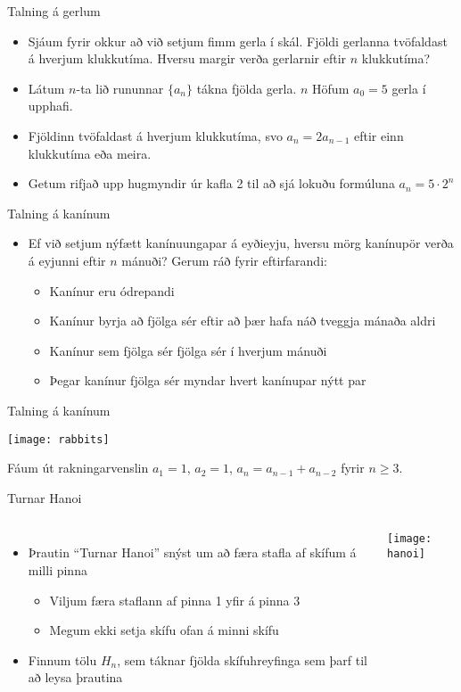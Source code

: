 \documentclass{beamer}
\begin{document}
\begin{frame}{Talning á gerlum}
\begin{itemize}[<+->]
 \item Sjáum fyrir okkur að við setjum fimm gerla í skál. Fjöldi gerlanna tvöfaldast á hverjum klukkutíma. Hversu margir verða gerlarnir eftir $n$ klukkutíma?
 \item Látum $n$-ta lið rununnar $\{a_n\}$ tákna fjölda gerla. $n$ Höfum $a_0 = 5$ gerla í upphafi.
 \item Fjöldinn tvöfaldast á hverjum klukkutíma, svo $a_n = 2a_{n-1}$ eftir einn klukkutíma eða meira.
 \item Getum rifjað upp hugmyndir úr kafla 2 til að sjá lokuðu formúluna $a_n = 5\cdot 2^n$
\end{itemize}
\end{frame}

\begin{frame}{Talning á kanínum}
 \begin{itemize}
  \item Ef við setjum nýfætt kanínuungapar á eyðieyju, hversu mörg kanínupör verða á eyjunni eftir $n$ mánuði? Gerum ráð fyrir eftirfarandi:
  \begin{itemize}
   \item Kanínur eru ódrepandi
   \item Kanínur byrja að fjölga sér eftir að þær hafa náð tveggja mánaða aldri
   \item Kanínur sem fjölga sér fjölga sér í hverjum mánuði
   \item Þegar kanínur fjölga sér myndar hvert kanínupar nýtt par
  \end{itemize}
 \end{itemize}
\end{frame}

\begin{frame}{Talning á kanínum}

\begin{center}
\texttt{[image: rabbits]}
\end{center}
Fáum út rakningarvenslin $a_1 = 1$, $a_2 = 1$, $a_n = a_{n-1} + a_{n-2}$ fyrir $n \geq 3$.
\end{frame}

\begin{frame}{Turnar Hanoi}
\begin{columns}
\begin{itemize}
 \item Þrautin ``Turnar Hanoi'' snýst um að færa stafla af skífum á milli pinna
 \begin{itemize}
  \item Viljum færa staflann af pinna 1 yfir á pinna 3
  \item Megum ekki setja skífu ofan á minni skífu
 \end{itemize}
 \item Finnum tölu $H_n$, sem táknar fjölda skífuhreyfinga sem þarf til að leysa þrautina
\end{itemize}
\texttt{[image: hanoi]}
\end{columns}
\end{frame}
\end{document}
